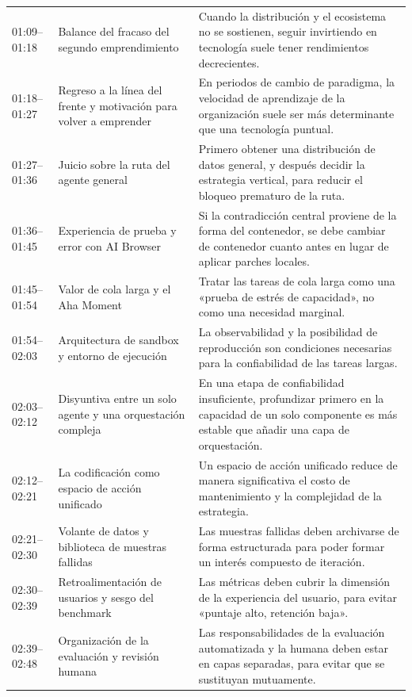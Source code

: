 \begin{longtable}{p{2.6cm}p{4.0cm}p{6.6cm}}
01:09--01:18 & Balance del fracaso del segundo emprendimiento & Cuando la distribución y el ecosistema no se sostienen, seguir invirtiendo en tecnología suele tener rendimientos decrecientes. \\
01:18--01:27 & Regreso a la línea del frente y motivación para volver a emprender & En periodos de cambio de paradigma, la velocidad de aprendizaje de la organización suele ser más determinante que una tecnología puntual. \\
01:27--01:36 & Juicio sobre la ruta del agente general & Primero obtener una distribución de datos general, y después decidir la estrategia vertical, para reducir el bloqueo prematuro de la ruta. \\
01:36--01:45 & Experiencia de prueba y error con AI Browser & Si la contradicción central proviene de la forma del contenedor, se debe cambiar de contenedor cuanto antes en lugar de aplicar parches locales. \\
01:45--01:54 & Valor de cola larga y el Aha Moment & Tratar las tareas de cola larga como una «prueba de estrés de capacidad», no como una necesidad marginal. \\
01:54--02:03 & Arquitectura de sandbox y entorno de ejecución & La observabilidad y la posibilidad de reproducción son condiciones necesarias para la confiabilidad de las tareas largas. \\
02:03--02:12 & Disyuntiva entre un solo agente y una orquestación compleja & En una etapa de confiabilidad insuficiente, profundizar primero en la capacidad de un solo componente es más estable que añadir una capa de orquestación. \\
02:12--02:21 & La codificación como espacio de acción unificado & Un espacio de acción unificado reduce de manera significativa el costo de mantenimiento y la complejidad de la estrategia. \\
02:21--02:30 & Volante de datos y biblioteca de muestras fallidas & Las muestras fallidas deben archivarse de forma estructurada para poder formar un interés compuesto de iteración. \\
02:30--02:39 & Retroalimentación de usuarios y sesgo del benchmark & Las métricas deben cubrir la dimensión de la experiencia del usuario, para evitar «puntaje alto, retención baja». \\
02:39--02:48 & Organización de la evaluación y revisión humana & Las responsabilidades de la evaluación automatizada y la humana deben estar en capas separadas, para evitar que se sustituyan mutuamente. \\

\end{longtable}
